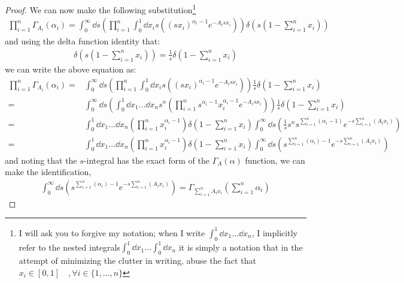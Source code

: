 \documentclass[a4paper,twoside]{article}
\begin{document}
\begin{proof}
We can now make the following substitution\footnote{I will ask you to forgive my notation; when I write $\int_{0}^{1} \dd{x_{1}}...\dd{x_{n}}$, I implicitly refer to the nested integrals$\int_{0}^{1} \dd{x_{1}}...\int_{0}^{1}\dd{x_{n}}$ it is simply a notation that in the attempt of minimizing the clutter in writing, abuse the fact that $x_{i} \in [0, 1] \quad,\forall i \in \{1, ... , n\} $}
\begin{align*}
\prod_{i=1}^{n}\Gamma_{A_{i}}(\alpha_{i}) 
= \int_{0}^{\infty} \dd{s} \left( \prod_{i=1}^{n} \int_{0}^{1} \dd{x_{i}} s \left( (s x_{i})^{\alpha_{i} - 1} e^{-A_{i}s x_{i}} \right) \right) \delta \left(s \left(1 - \sum_{i=1}^{n}x_{i} \right) \right) 
\end{align*}
and using the delta function identity that:
\begin{align*}
\delta \left(s \left(1 - \sum_{i=1}^{n}x_{i} \right) \right) = \frac{1}{s}\delta \left(1 - \sum_{i=1}^{n}x_{i} \right)
\end{align*}
we can write the above equation as:
\begin{align*}
\prod_{i=1}^{n}\Gamma_{A_{i}}(\alpha_{i}) 
=& \int_{0}^{\infty} \dd{s} \left( \prod_{i=1}^{n} \int_{0}^{1} \dd{x_{i}} s \left( (s x_{i})^{\alpha_{i} - 1} e^{-A_{i}s x_{i}} \right) \right) \frac{1}{s} \delta \left(1 - \sum_{i=1}^{n}x_{i} \right) \\
=& \int_{0}^{\infty} \dd{s} \left( \int_{0}^{1} \dd{x_{1}}...\dd{x_{n}} s^{n} \left( \prod_{i=1}^{n} s^{\alpha_{i} - 1} x_{i}^{\alpha_{i} - 1} e^{-A_{i}s x_{i}} \right) \right) \frac{1}{s} \delta \left(1 - \sum_{i=1}^{n}x_{i}\right) \\
=&  \int_{0}^{1} \dd{x_{1}}...\dd{x_{n}} \left( \prod_{i=1}^{n} x_{i}^{\alpha_{i} - 1} \right) \delta \left(1 - \sum_{i=1}^{n}x_{i}\right) 
\int_{0}^{\infty} \dd{s} \left( \frac{1}{s} s^{n} s^{\sum_{i=1}^{n}(\alpha_{i} - 1)} e^{-s\sum_{i=1}^{n}(A_{i} x_{i})} \right) \\
=&  \int_{0}^{1} \dd{x_{1}}...\dd{x_{n}} \left( \prod_{i=1}^{n} x_{i}^{\alpha_{i} - 1} \right) \delta \left(1 - \sum_{i=1}^{n}x_{i}\right) 
\int_{0}^{\infty} \dd{s} \left( s^{\sum_{i=1}^{n}(\alpha_{i}) - 1} e^{-s\sum_{i=1}^{n}(A_{i} x_{i})} \right)
\end{align*}
and noting that the $s$-integral has the exact form of the $\Gamma_{A}(\alpha)$ function, we can make the identification, 
\begin{align*}
\int_{0}^{\infty} \dd{s} \left( s^{\sum_{i=1}^{n}(\alpha_{i}) - 1} e^{-s\sum_{i=1}^{n}(A_{i} x_{i})} \right) 
= \Gamma_{\sum_{i=1}^{n}A_{i}x_{i}} \left( \sum_{i=1}^{n} \alpha_{i} \right) 

\end{align*}
\end{proof}
\end{document}
